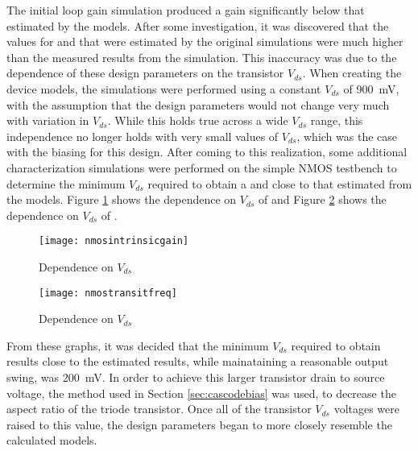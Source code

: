 The initial loop gain simulation produced a gain significantly below that estimated by the \gmid\spc models. After some investigation, it was discovered that the values for \gmgds\spc and \transit\spc that were estimated by the original \gmid\spc simulations were much higher than the measured results from the simulation. This inaccuracy was due to the dependence of these design parameters on the transistor $V_{ds}$. When creating the device models, the simulations were performed using a constant $V_{ds}$ of \SI{900}{\milli\volt}, with the assumption that the design parameters would not change very much with variation in $V_{ds}$. While this holds true across a wide $V_{ds}$ range, this independence no longer holds with very small values of $V_{ds}$, which was the case with the biasing for this design. After coming to this realization, some additional characterization simulations were performed on the simple NMOS testbench to determine the minimum $V_{ds}$ required to obtain a \transit\spc and \gmgds\spc close to that estimated from the models. Figure \ref{fig:vdsdepgmgds} shows the dependence on $V_{ds}$ of \gmgds\spc and Figure \ref{fig:vdsdeptransit} shows the dependence on $V_{ds}$ of \transit. 
\begin{figure}[htbp]
\centering
\texttt{[image: nmosintrinsicgain]}
\caption{\gmgds\spc Dependence on $V_{ds}$} 
\label{fig:vdsdepgmgds}
\end{figure}
\begin{figure}[htbp]
\centering
\texttt{[image: nmostransitfreq]}
\caption{\transit\spc Dependence on $V_{ds}$} 
\label{fig:vdsdeptransit}
\end{figure}
From these graphs, it was decided that the minimum $V_{ds}$ required to obtain results close to the estimated results, while mainataining a reasonable output swing, was \SI{200}{\milli\volt}. In order to achieve this larger transistor drain to source voltage, the method used in Section \ref{sec:cascodebias} was used, to decrease the aspect ratio of the triode transistor. Once all of the transistor $V_{ds}$ voltages were raised to this value, the design parameters began to more closely resemble the calculated models.

